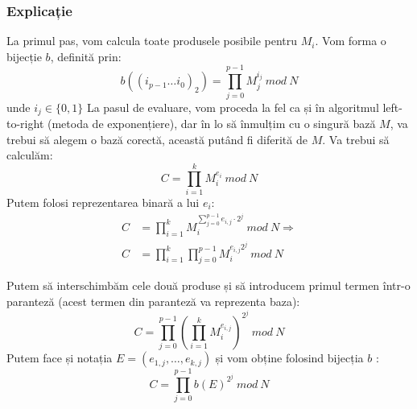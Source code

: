 \documentclass[12]{report}
\begin{document}
		   \subsubsection{Explicație}
		   La primul pas, vom calcula toate produsele posibile pentru $M_i$. Vom forma o bijecție $b$, definită prin: \\
		   $$ b((i_{p-1} \dots i_0)_2)= \prod_{j=0}^{p-1} M^{i_j}_{j} \ mod \ N$$
		   unde $i_j \in \lbrace  0,1  \rbrace $
		   La pasul de evaluare, vom proceda la fel ca și în algoritmul left-to-right (metoda de exponențiere), dar în lo să înmulțim cu o singură bază $M$, va trebui să alegem o bază corectă, această putând fi diferită de $M$. Va trebui să calculăm: 
		   $$ C = \prod_{i=1}^{k} M_{i}^{e_i} \ mod \ N$$
		   Putem folosi reprezentarea binară a lui $e_i$:
		   \begin{align*}
		    C &= \prod_{i=1}^{k} M_{i}^{\sum_{j=0}^{p-1} e_{i,j} \cdot   2^j} \ mod \ N \Rightarrow \\
		    C &= \prod_{i=1}^{k} \prod_{j=0}^{p-1} M_{i}^{e_{i,j}2^j} \ mod \ N
		   \end{align*}
		   
		   Putem să interschimbăm cele două produse și să introducem primul termen într-o paranteză (acest termen din paranteză va reprezenta baza):
		   $$C = \prod_{j=0}^{p-1} \left(   \prod_{i=1}^{k} M_{i}^{e_{i,j}}     \right)^{2^j} \ mod \ N $$
		   Putem face și notația $E=(e_{1,j}, \dots ,e_{k,j})$ și vom obține folosind bijecția $b$ :
		   $$ C = \prod_{j=0}^{p-1} b(E)^{2^j}  \ mod \ N$$





\medskip
\end{document}
